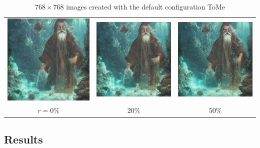 \begin{table}[!htb]
\centering
\begin{tabular}{c c c}
    \includegraphics[width=0.3\linewidth]{static/sample_imgs/secondary/wizard_0.png} & \includegraphics[width=0.3\linewidth]{static/sample_imgs/secondary/wizard_20.png} &
    \includegraphics[width=0.3\linewidth]{static/sample_imgs/secondary/wizard_50.png}\\
    \(r=0\%\) & \(20\%\) & \(50\%\) \\
\end{tabular}
\caption{$768 \times 768$ images created with the default configuration ToMe}
\end{table}


\subsection{Results}





